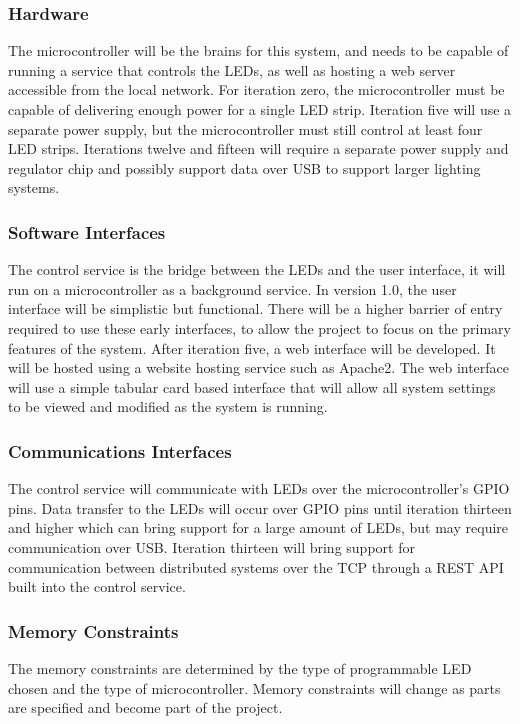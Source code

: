 			\subsubsection{Hardware}
				The microcontroller will be the brains for this system, and needs to be capable of running a service that controls the LEDs, as well as hosting a web server accessible from the local network.
				For iteration zero, the microcontroller must be capable of delivering enough power for a single LED strip. Iteration five will use a separate power supply, but the microcontroller must still control
				at least four LED strips. Iterations twelve and fifteen will require a separate power supply and regulator chip and possibly support data over USB to support larger lighting systems.
			\subsubsection{Software Interfaces}
				The control service is the bridge between the LEDs and the user interface, it will run on a microcontroller as a background service.
				In version 1.0, the user interface will be simplistic but functional. There will be a higher barrier of entry required to use these early interfaces, to allow the project to focus on the primary features of the system.
				After iteration five, a web interface will be developed. It will be hosted using a website hosting service such as Apache2. The web interface will use a simple tabular card based interface
				that will allow all system settings to be viewed and modified as the system is running.

			\subsubsection{Communications Interfaces}
				The control service will communicate with LEDs over the microcontroller's GPIO pins. Data transfer to the LEDs will occur over GPIO pins until iteration thirteen and higher which can bring support for a
				large amount of LEDs, but may require communication over USB.
				Iteration thirteen will bring support for communication between distributed systems over the TCP through a REST API built into the control service.
			\subsubsection{Memory Constraints}
				The memory constraints are determined by the type of programmable LED chosen and the type of microcontroller. Memory constraints will change as parts are specified and become part of the project.

